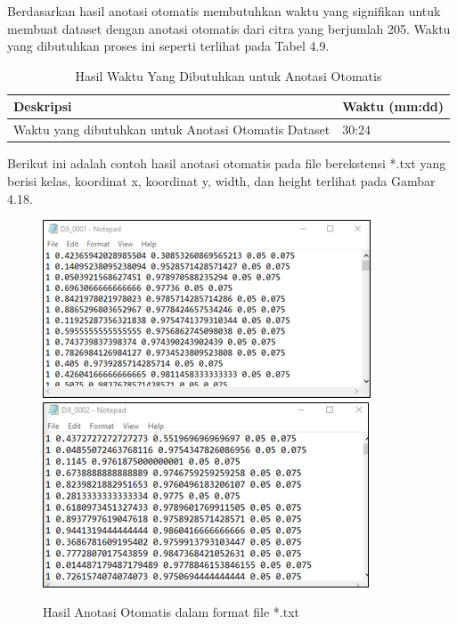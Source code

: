 Berdasarkan hasil anotasi otomatis membutuhkan waktu yang signifikan untuk membuat dataset dengan anotasi otomatis dari citra yang berjumlah 205. Waktu yang dibutuhkan proses ini seperti terlihat pada Tabel 4.9.

\begin{singlespace}
	\begin{table}[H]
		\centering
		\caption{Hasil Waktu Yang Dibutuhkan untuk Anotasi Otomatis}
		\label{tbl:Hasil-Waktu-Yang-Dibutuhkan-Untuk-Anotasi-Otomatis}
		\begin{tabular}{|m{10cm}|m{2cm}}
			\hline
			\rowcolor[HTML]{D9D9D9} 
			Deskripsi                                            & Waktu (mm:dd) \\ \hline
			Waktu yang dibutuhkan untuk Anotasi Otomatis Dataset & 30:24         \\ \hline
		\end{tabular}
	\end{table}
\end{singlespace}

Berikut ini adalah contoh hasil anotasi otomatis pada file berekstensi *.txt yang berisi kelas, koordinat x, koordinat y, width, dan height terlihat pada Gambar 4.18.

\begin{figure}[H]
	\vspace{-0.1cm}
	\begin{center}
		\includegraphics[width=0.6\columnwidth]{bab4/Gambar/Picture18.1.png}
		\includegraphics[width=0.6\columnwidth]{bab4/Gambar/Picture18.2.png}
	\end{center}
	\vspace{-0.2cm}
	\captionsetup{justification=centering}
	\caption{Hasil Anotasi Otomatis dalam format file *.txt}\label{img:Hasil-Anotasi-Otomatis}
\end{figure}

